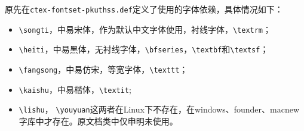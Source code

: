 原先\pkuthss{}在\verb|ctex-fontset-pkuthss.def|定义了使用的字体依赖，具体情况如下：
\begin{itemize}
    \item \verb|\songti|，中易宋体，作为默认中文字体使用，衬线字体，\verb|\textrm|；
    \item \verb|\heiti|，中易黑体，无衬线字体，\verb|\bfseries|，\verb|\textbf|和\verb|\textsf|；
    \item \verb|\fangsong|，中易仿宋，等宽字体，\verb|\texttt|；
    \item \verb|\kaishu|，中易楷体，\verb|\textit|;
    \item \verb|\lishu|， \verb|\youyuan|这两者在Linux下不存在，在windows、founder、macnew字库中才存在。原\pkuthss{}文档类中仅申明未使用。
\end{itemize}

